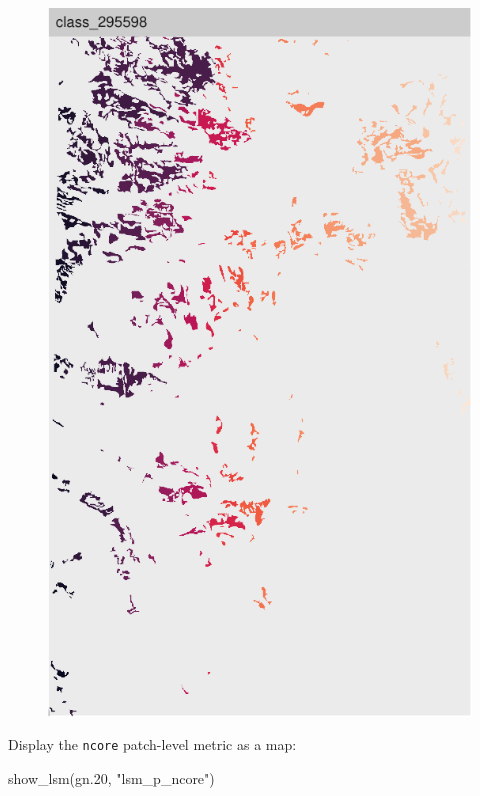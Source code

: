 \documentclass[
  letterpaper,
  DIV=11,
  numbers=noendperiod]{scrartcl}
\newenvironment{Shaded}{\begin{snugshade}}{\end{snugshade}}
\newcommand{\FloatTok}[1]{\textcolor[rgb]{0.68,0.00,0.00}{#1}}
\newcommand{\FunctionTok}[1]{\textcolor[rgb]{0.28,0.35,0.67}{#1}}
\newcommand{\NormalTok}[1]{\textcolor[rgb]{0.00,0.23,0.31}{#1}}
\newcommand{\StringTok}[1]{\textcolor[rgb]{0.13,0.47,0.30}{#1}}
\begin{document}
\begin{figure}[H]

{\centering \includegraphics{PatternAnalysisWorkshopTutorial_files/figure-pdf/show-patches-Erie-20-1.pdf}

}

\end{figure}

Display the \texttt{ncore} patch-level metric as a map:

\begin{Shaded}
\begin{Highlighting}[]
\FunctionTok{show\_lsm}\NormalTok{(gn}\FloatTok{.20}\NormalTok{, }\StringTok{"lsm\_p\_ncore"}\NormalTok{)}
\end{Highlighting}
\end{Shaded}
\end{document}
